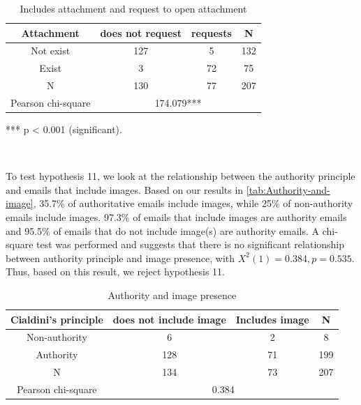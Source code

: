 \begin{minipage}[t]{1\columnwidth}%
\begin{longtable}{cccc}
\caption{\label{tab:Includes-attachment-and}Includes attachment and request
to open attachment}
\tabularnewline
\toprule 
{\footnotesize{}Attachment} & {\footnotesize{}does not request} & {\footnotesize{}requests} & \multirow{1}{*}{{\footnotesize{}N}}\tabularnewline
\midrule 
\multirow{1}{*}{{\footnotesize{}Not exist}} & {\footnotesize{}127} & {\footnotesize{}5} & \multirow{1}{*}{{\footnotesize{}132}}\tabularnewline
\midrule 
\multirow{1}{*}{{\footnotesize{}Exist}} & {\footnotesize{}3} & {\footnotesize{}72} & \multirow{1}{*}{{\footnotesize{}75}}\tabularnewline
\midrule
\midrule 
{\footnotesize{}N} & {\footnotesize{}130} & {\footnotesize{}77} & {\footnotesize{}207}\tabularnewline
\midrule
\midrule 
{\footnotesize{}Pearson chi-square} & \multicolumn{3}{c}{{\footnotesize{}174.079{*}{*}{*}}}\tabularnewline
\midrule
\end{longtable}%
\end{minipage}

{*}{*}{*} p < 0.001 (significant).

\ 

To test hypothesis 11, we look at the relationship between the authority
principle and emails that include images. Based on our results in
\autoref{tab:Authority-and-image}, 35.7\% of authoritative emails
include images, while 25\% of non-authority emails include images.
97.3\% of emails that include images are authority emails and 95.5\%
of emails that do not include image(s) are authority emails. A chi-square
test was performed and suggests that there is no significant relationship
between authority principle and image presence, with $X^{2}(1)=0.384,p=0.535$.
Thus, based on this result, we reject hypothesis 11.

\begin{minipage}[t]{1\columnwidth}%
\begin{longtable}{cccc}
\caption{\label{tab:Authority-and-image}Authority and image presence}
\tabularnewline
\toprule 
{\footnotesize{}Cialdini's principle} & {\footnotesize{}does not include image} & {\footnotesize{}Includes image} & \multirow{1}{*}{{\footnotesize{}N}}\tabularnewline
\midrule 
\multirow{1}{*}{{\footnotesize{}Non-authority}} & {\footnotesize{}6} & {\footnotesize{}2} & \multirow{1}{*}{{\footnotesize{}8}}\tabularnewline
\midrule 
\multirow{1}{*}{{\footnotesize{}Authority}} & {\footnotesize{}128} & {\footnotesize{}71} & \multirow{1}{*}{{\footnotesize{}199}}\tabularnewline
\midrule
\midrule 
{\footnotesize{}N} & {\footnotesize{}134} & {\footnotesize{}73} & {\footnotesize{}207}\tabularnewline
\midrule
\midrule 
{\footnotesize{}Pearson chi-square} & \multicolumn{3}{c}{{\footnotesize{}0.384}}\tabularnewline
\midrule
\end{longtable}%
\end{minipage}

